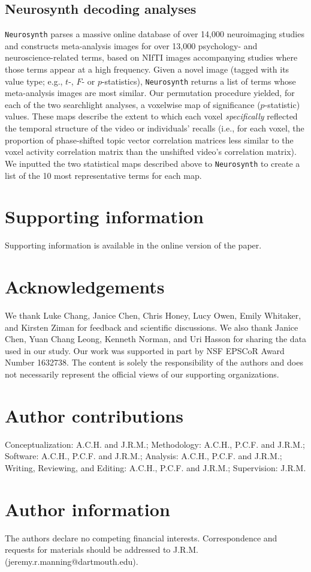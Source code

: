 \documentclass{article}
\begin{document}
\subsection*{Neurosynth decoding analyses}
\texttt{Neurosynth} parses a massive online database of over 14,000 neuroimaging studies and constructs meta-analysis images for over 13,000 psychology- and neuroscience-related terms, based on NIfTI images accompanying studies where those terms appear at a high frequency.  Given a novel image (tagged with its value type; e.g., $t$-, $F$- or $p$-statistics), \texttt{Neurosynth} returns a list of terms whose meta-analysis images are most similar.  Our permutation procedure yielded, for each of the two searchlight analyses, a voxelwise map of significance ($p$-statistic) values.  These maps describe the extent to which each voxel \textit{specifically} reflected the temporal structure of the video or individuals' recalls (i.e., for each voxel, the proportion of phase-shifted topic vector correlation matrices less similar to the voxel activity correlation matrix than the unshifted video's correlation matrix). We inputted the two statistical maps described above to \texttt{Neurosynth} to create a list of the 10 most representative terms for each map.


% 


\section*{Supporting information}
Supporting information is available in the online version of the paper.

\section*{Acknowledgements}
We thank Luke Chang, Janice Chen, Chris Honey, Lucy Owen, Emily Whitaker, and Kirsten Ziman for feedback and scientific discussions. We also thank Janice Chen, Yuan Chang Leong, Kenneth Norman, and Uri Hasson for sharing the data used in our study.  Our work was supported in part by NSF EPSCoR Award Number 1632738. The content is solely the responsibility of the authors and does not necessarily represent the official views of our supporting organizations.

\section*{Author contributions}
Conceptualization: A.C.H. and J.R.M.; Methodology: A.C.H., P.C.F. and J.R.M.; Software: A.C.H., P.C.F. and J.R.M.; Analysis: A.C.H., P.C.F. and J.R.M.; Writing, Reviewing, and Editing: A.C.H., P.C.F. and J.R.M.; Supervision: J.R.M.

\section*{Author information}
The authors declare no competing financial interests.  Correspondence and requests for materials should be addressed to J.R.M. (jeremy.r.manning@dartmouth.edu).
\end{document}
